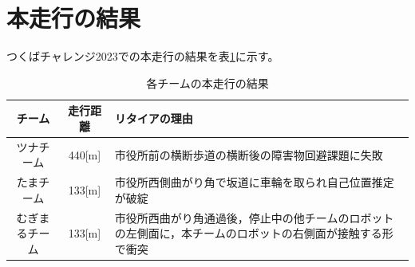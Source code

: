 \documentclass[twocolumn,9pt]{jsproceedings}
\begin{document}




\section{本走行の結果}

つくばチャレンジ2023での本走行の結果を表\ref{MainRun}に示す。

\begin{table}[H]
  \caption{各チームの本走行の結果}
  \label{MainRun}
  \begin{tabular}{|c|c|p{4.0cm}|}
    \hline
    チーム         & 走行距離 & リタイアの理由                                                                                             \\
    \hline
    ツナチーム     & 440[m]   & 市役所前の横断歩道の横断後の障害物回避課題に失敗                                                           \\
    \hline
    たまチーム     & 133[m]   & 市役所西側曲がり角で坂道に車輪を取られ自己位置推定が破綻                                                   \\
    \hline
    むぎまるチーム & 133[m]    & 市役所西曲がり角通過後，停止中の他チームのロボットの左側面に，本チームのロボットの右側面が接触する形で衝突 \\
    \hline
  \end{tabular}
\end{table}
\end{document}
